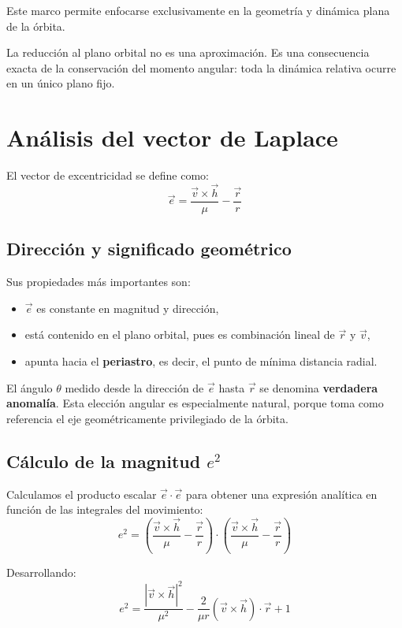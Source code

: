 Este marco permite enfocarse exclusivamente en la geometría y dinámica plana de la órbita.

\begin{importante}
La reducción al plano orbital no es una aproximación. Es una consecuencia exacta de la conservación del momento angular: toda la dinámica relativa ocurre en un único plano fijo.
\end{importante}

\section{Análisis del vector de Laplace}
El vector de excentricidad se define como:
\[
\vec{e} = \frac{\vec{v} \times \vec{h}}{\mu} - \frac{\vec{r}}{r}
\]

\subsection{Dirección y significado geométrico}
Sus propiedades más importantes son:
\begin{itemize}
    \item \(\vec{e}\) es constante en magnitud y dirección,
    \item está contenido en el plano orbital, pues es combinación lineal de \(\vec{r}\) y \(\vec{v}\),
    \item apunta hacia el \textbf{periastro}, es decir, el punto de mínima distancia radial.
\end{itemize}

El ángulo \(\theta\) medido desde la dirección de \(\vec{e}\) hasta \(\vec{r}\) se denomina \textbf{verdadera anomalía}. Esta elección angular es especialmente natural, porque toma como referencia el eje geométricamente privilegiado de la órbita.

\subsection{Cálculo de la magnitud \texorpdfstring{$e^2$}{e²}}
Calculamos el producto escalar \(\vec{e} \cdot \vec{e}\) para obtener una expresión analítica en función de las integrales del movimiento:
\[
 e^2 = \left( \frac{\vec{v} \times \vec{h}}{\mu} - \frac{\vec{r}}{r} \right) \cdot \left( \frac{\vec{v} \times \vec{h}}{\mu} - \frac{\vec{r}}{r} \right)
\]

Desarrollando:
\[
 e^2 = \frac{|\vec{v} \times \vec{h}|^2}{\mu^2} - \frac{2}{\mu r}(\vec{v} \times \vec{h}) \cdot \vec{r} + 1
\]

